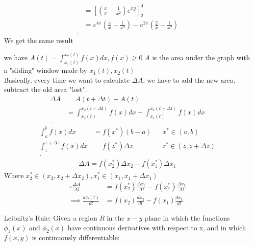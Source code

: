 \begin{itemize}
\begin{example}
\begin{align*}
				&= \left[ \left( \frac{y}{x}-\frac{1}{x^2} \right) e^{xy} \right] _2^4 \\
				&= e^{4x}\left( \frac{4}{x}-\frac{1}{x^2} \right) -e^{2x}\left( \frac{2}{x}-\frac{1}{x^2} \right)  \\
			.\end{align*}
			We get the same result
		\end{example}
		\begin{example}
			we have $A(t) = \int_{x_1(t)}^{x_2(t)} f(x)dx, f(x)\ge 0 $ $ A $ is the area under the graph with a "sliding" window made by $x_1(t), x_2(t)$\\
			Basically, every time we want to calculate $\Delta A$, we have to add the new area, subtract the old area "lost".
			\begin{align*}
				\Delta A &= A\left( t+\Delta t \right) - A\left( t \right) \\
						 &= \int_{x_2(t)}^{x_{2}\left( t+\Delta t \right) } f\left( x \right) dx  - \int_{x_1(t)}^{x_1(t+\Delta t)} f(x)dx \\
			.\end{align*}
			\begin{align*}
				\int_{a}^{b} f\left( x \right) dx &= f\left( x^* \right) (b-a) && x^* \in (a,b)\\
				\int_{z}^{z+\Delta z} f(x)dx &= f\left( z^* \right) \Delta z  && z^* \in \left( z, z+\Delta z \right) \\ 
			.\end{align*}
			\begin{align*}
			\Delta A = f\left( x_2^* \right) \Delta x_2 - f\left( x_1^* \right) \Delta x_1
			\end{align*}
			Where $x_2^* \in \left( x_2, x_2+\Delta x_2 \right) , x_1^* \in \left( x_1, x_1+\Delta x_1 \right) $ 
			\begin{align*}
				\therefore \frac{\Delta A}{\Delta t} &= f\left( x_2^* \right) \frac{\Delta x_2}{\Delta t} - f\left( x_1^* \right) \frac{\Delta x_1}{\Delta t}  \\
			\implies \frac{dA(t)}{dt} &=  f\left( x_2 \right) \frac{dx_2}{dt}-f\left( x_1 \right) \frac{dx_1}{dt} 
			\end{align*}
		\end{example}
		\begin{theorem}
			Leibnitz's Rule: Given a region $R$ in the $x-y$ plane in which the functions $\phi_1(x)$ and $\phi_2(x)$ have continuous derivatives with respect to x, and in which $f\left( x,y \right)$ is continuously differentiable:\\

\end{theorem}
\end{itemize}
